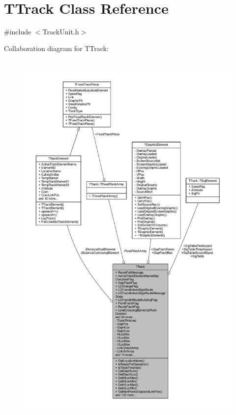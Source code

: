 \hypertarget{class_t_track}{}\section{T\+Track Class Reference}
\label{class_t_track}


{\ttfamily \#include $<$Track\+Unit.\+h$>$}



Collaboration diagram for T\+Track\+:\nopagebreak
\begin{figure}[H]
\begin{center}
\leavevmode
\includegraphics[height=550pt]{class_t_track__coll__graph}
\end{center}
\end{figure}
